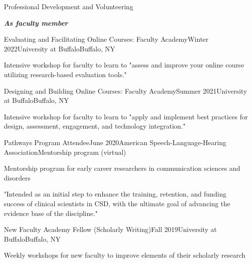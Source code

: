 \documentclass{resume} %
\begin{document}
\begin{rSection}{Professional Development and Volunteering}

\bigskip
\begin{center}
	{\bf \emph{As faculty member}}\\
\end{center}


	\begin{rSubsection}{Evaluating and Facilitating Online Courses: Faculty Academy}{Winter 2022}{University at Buffalo}{Buffalo, NY}
		\item Intensive workshop for faculty to learn to "assess and improve your online course utilizing research-based evaluation tools."
	\end{rSubsection}

	\begin{rSubsection}{Designing and Building Online Courses: Faculty Academy}{Summer 2021}{University at Buffalo}{Buffalo, NY}
		\item Intensive workshop for faculty to learn to "apply and implement best practices for design, assessment, engagement, and technology integration."
	\end{rSubsection}


	\begin{rSubsection}{Pathways Program Attendee}{June 2020}{American Speech-Language-Hearing Association}{Mentorship program (virtual)}
		\item Mentorship program for early career researchers in communication sciences and disorders
		\item "Intended as an initial step to enhance the training, retention, and funding success of clinical scientists in CSD, with the ultimate goal of advancing the evidence base of the discipline."
	\end{rSubsection}

	\begin{rSubsection}{New Faculty Academy Fellow (Scholarly Writing)}{Fall 2019}{University at Buffalo}{Buffalo, NY}
		\item Weekly workshops for new faculty to improve elements of their scholarly research
	\end{rSubsection}

\bigskip


\end{rSection}
\end{document}
